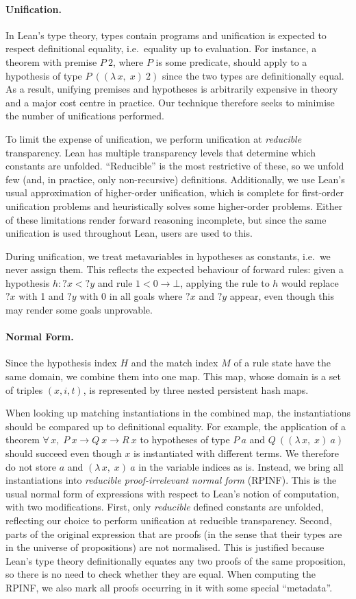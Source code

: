 \documentclass[runningheads,leqno]{llncs}
\newcommand{\para}[1]{\paragraph{\bfseries\upshape #1}}
\newcommand{\Lam}[2]{\ensuremath{\lambda\, #1,\; #2}}
\newcommand{\All}[2]{\ensuremath{\forall\, #1,\; #2}}
\newcommand{\mvar}[1]{\ensuremath{{?#1}}}
\begin{document}
\para{Unification.}
In Lean's type theory, types contain programs and unification is expected to respect definitional equality, i.e.\ equality up to evaluation.
For instance, a theorem with premise $P~2$, where $P$ is some predicate, should apply to a hypothesis of type $P~((\Lam{x}{x})~2)$ since the two types are definitionally equal.
As a result, unifying premises and hypotheses is arbitrarily expensive in theory and a major cost centre in practice.
Our technique therefore seeks to minimise the number of unifications performed.

To limit the expense of unification, we perform unification at \emph{reducible} transparency.
Lean has multiple transparency levels that determine which constants are unfolded.
\enquote{Reducible} is the most restrictive of these, so we unfold few (and, in practice, only non-recursive) definitions.
Additionally, we use Lean's usual approximation of higher-order unification, which is complete for first-order unification problems and heuristically solves some higher-order problems.
Either of these limitations render forward reasoning incomplete, but since the same unification is used throughout Lean, users are used to this.

During unification, we treat metavariables in hypotheses as constants, i.e.\ we never assign them.
This reflects the expected behaviour of forward rules: given a hypothesis $h : \mvar{x} < \mvar{y}$ and rule $1 < 0 → ⊥$, applying the rule to $h$ would replace $\mvar{x}$ with 1 and $\mvar{y}$ with 0 in all goals where $\mvar{x}$ and $\mvar{y}$ appear, even though this may render some goals unprovable.

\para{Normal Form.}
Since the hypothesis index $H$ and the match index $M$ of a rule state have the same domain, we combine them into one map.
This map, whose domain is a set of triples $(x, i, t)$, is represented by three nested persistent hash maps.

When looking up matching instantiations in the combined map, the instantiations should be compared up to definitional equality.
For example, the application of a theorem $\All{x}{P~x → Q~x → R~x}$ to hypotheses of type $P~a$ and $Q~((\Lam{x}{x})~a)$ should succeed even though $x$ is instantiated with different terms.
We therefore do not store $a$ and $(\Lam{x}{x})~a$ in the variable indices as is.
Instead, we bring all instantiations into \emph{reducible proof-irrelevant normal form} (RPINF).
This is the usual normal form of expressions with respect to Lean's notion of computation, with two modifications.
First, only \emph{reducible} defined constants are unfolded, reflecting our choice to perform unification at reducible transparency.
Second, parts of the original expression that are proofs (in the sense that their types are in the universe of propositions) are not normalised.
This is justified because Lean's type theory definitionally equates any two proofs of the same proposition, so there is no need to check whether they are equal.
When computing the RPINF, we also mark all proofs occurring in it with some special \enquote{metadata}.
\end{document}
